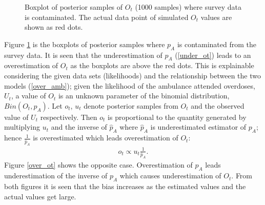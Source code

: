 \documentclass[12pt]{article}
\begin{document}
{\begin{figure}[htb]
	\centering
	\caption[Contaminated $p_{A,t}$: boxplot of posterior samples of $O_t$ ]{Boxplot of posterior samples of $O_t$ (1000 samples) where survey data is contaminated.  The actual data point of simulated $O_t$ values are shown as red dots.}
	\label{contam_ot}
\end{figure}

\normalsize 
Figure \ref{contam_ot} is the boxplots of posterior samples where $p_A$ is contaminated from the survey data. It is seen that the underestimation of $p_A$ (\ref{under_ot}) leads to an overestimation of $O_t$ as the boxplots are above the red dots. This is explainable considering the given data sets (likelihoods) and the relationship between the two models (\ref{over_amb}); given the likelihood of the ambulance attended overdoses, $U_t$, a value of $O_t$ is an unknown parameter of the binomial distribution, $Bin(O_t, p_A)$. Let $o_t$, $u_t$ denote posterior samples from $O_t$ and the observed value of $U_t$ respectively. Then $o_t$ is proportional to the quantity generated by multiplying $u_t$ and the inverse of $\hat{p}_{A}$ where $\hat{p}_{A}$ is underestimated estimator of $p_A$; hence $\frac{1}{\hat{p}_{A}}$ is overestimated which leads overestimation of $O_t$:
\begin{equation}
\label{ot.how.made}
\begin{aligned}
o_t \propto u_t \frac{1}{\hat{p}_{A}}.
\end{aligned}
\end{equation}
Figure \ref{over_ot} shows the opposite case. Overestimation of $p_A$ leads underestimation of the inverse of $p_A$ which causes underestimation of $O_t$. From both figures it is seen that the bias increases as the estimated values and the actual values get large.\\

}
\end{document}
